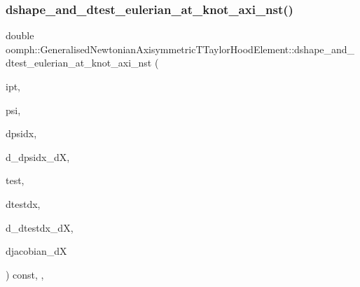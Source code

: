 \mbox{\label{classoomph_1_1GeneralisedNewtonianAxisymmetricTTaylorHoodElement_a9e65234ae86b30a0b2fd82d5495033c5}} 
\subsubsection{\texorpdfstring{dshape\+\_\+and\+\_\+dtest\+\_\+eulerian\+\_\+at\+\_\+knot\+\_\+axi\+\_\+nst()}{dshape\_and\_dtest\_eulerian\_at\_knot\_axi\_nst()}\hspace{0.1cm}{\footnotesize\ttfamily [2/2]}}
{\footnotesize\ttfamily double oomph\+::\+Generalised\+Newtonian\+Axisymmetric\+T\+Taylor\+Hood\+Element\+::dshape\+\_\+and\+\_\+dtest\+\_\+eulerian\+\_\+at\+\_\+knot\+\_\+axi\+\_\+nst (\begin{DoxyParamCaption}\item[{const unsigned \&}]{ipt,  }\item[{\hyperlink{classoomph_1_1Shape}{Shape} \&}]{psi,  }\item[{\hyperlink{classoomph_1_1DShape}{D\+Shape} \&}]{dpsidx,  }\item[{\hyperlink{classoomph_1_1RankFourTensor}{Rank\+Four\+Tensor}$<$ double $>$ \&}]{d\+\_\+dpsidx\+\_\+dX,  }\item[{\hyperlink{classoomph_1_1Shape}{Shape} \&}]{test,  }\item[{\hyperlink{classoomph_1_1DShape}{D\+Shape} \&}]{dtestdx,  }\item[{\hyperlink{classoomph_1_1RankFourTensor}{Rank\+Four\+Tensor}$<$ double $>$ \&}]{d\+\_\+dtestdx\+\_\+dX,  }\item[{\hyperlink{classoomph_1_1DenseMatrix}{Dense\+Matrix}$<$ double $>$ \&}]{djacobian\+\_\+dX }\end{DoxyParamCaption}) const\hspace{0.3cm}{\ttfamily [inline]}, {\ttfamily [protected]}, {\ttfamily [virtual]}}




